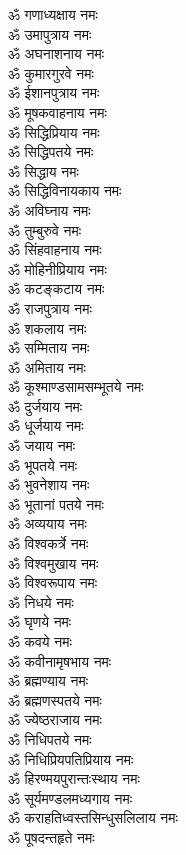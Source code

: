 \begin{multicols}{2}
\begin{flushleft}
ॐ गणाध्यक्षाय नमः\\
ॐ उमापुत्राय नमः\\
ॐ अघनाशनाय नमः\\
ॐ कुमारगुरवे नमः\\
ॐ ईशानपुत्राय नमः\\
ॐ मूषकवाहनाय नमः\\
ॐ सिद्धिप्रियाय नमः\\
ॐ सिद्धिपतये नमः\\
ॐ सिद्धाय नमः\hfill{}\\
ॐ सिद्धिविनायकाय नमः\\
ॐ अविघ्नाय नमः\\
ॐ तुम्बुरुवे नमः\\
ॐ सिंहवाहनाय नमः\\
ॐ मोहिनीप्रियाय नमः\\
ॐ कटङ्कटाय नमः\\
ॐ राजपुत्राय नमः\\
ॐ शकलाय नमः\\
ॐ सम्मिताय नमः\\
ॐ अमिताय नमः\hfill{}\\
ॐ कूश्माण्डसामसम्भूतये नमः\\
ॐ दुर्जयाय नमः\\
ॐ धूर्जयाय नमः\\
ॐ जयाय नमः\\
ॐ भूपतये नमः\\
ॐ भुवनेशाय नमः\\
ॐ भूतानां पतये नमः\\
ॐ अव्ययाय नमः\\
ॐ विश्वकर्त्रे नमः\\
ॐ विश्वमुखाय नमः\hfill{}\\
ॐ विश्वरूपाय नमः\\
ॐ निधये नमः\\
ॐ घृणये नमः\\
ॐ कवये नमः\\
ॐ कवीनामृषभाय नमः\\
ॐ ब्रह्मण्याय नमः\\
ॐ ब्रह्मणस्पतये नमः\\
ॐ ज्येष्ठराजाय नमः\\
ॐ निधिपतये नमः\\
ॐ निधिप्रियपतिप्रियाय नमः\hfill{}\\
ॐ हिरण्मयपुरान्तःस्थाय नमः\\
ॐ सूर्यमण्डलमध्यगाय नमः\\
ॐ कराहतिध्वस्तसिन्धुसलिलाय नमः\\
ॐ पूषदन्तहृते नमः\\

\end{flushleft}
\end{multicols}
